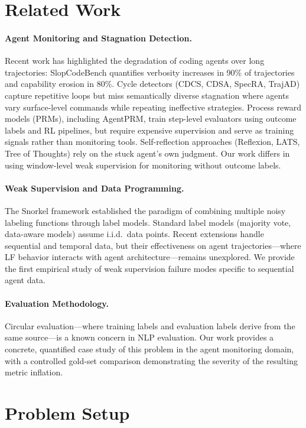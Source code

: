 \documentclass[11pt]{article}
\begin{document}
\section{Related Work}

\paragraph{Agent Monitoring and Stagnation Detection.}
Recent work has highlighted the degradation of coding agents over long trajectories: SlopCodeBench quantifies verbosity increases in 90\% of trajectories and capability erosion in 80\%. Cycle detectors (CDCS, CDSA, SpecRA, TrajAD) capture repetitive loops but miss semantically diverse stagnation where agents vary surface-level commands while repeating ineffective strategies. Process reward models (PRMs), including AgentPRM, train step-level evaluators using outcome labels and RL pipelines, but require expensive supervision and serve as training signals rather than monitoring tools. Self-reflection approaches (Reflexion, LATS, Tree of Thoughts) rely on the stuck agent's own judgment. Our work differs in using window-level weak supervision for monitoring without outcome labels.

\paragraph{Weak Supervision and Data Programming.}
The Snorkel framework established the paradigm of combining multiple noisy labeling functions through label models. Standard label models (majority vote, data-aware models) assume i.i.d.\ data points. Recent extensions handle sequential and temporal data, but their effectiveness on agent trajectories---where LF behavior interacts with agent architecture---remains unexplored. We provide the first empirical study of weak supervision failure modes specific to sequential agent data.

\paragraph{Evaluation Methodology.}
Circular evaluation---where training labels and evaluation labels derive from the same source---is a known concern in NLP evaluation. Our work provides a concrete, quantified case study of this problem in the agent monitoring domain, with a controlled gold-set comparison demonstrating the severity of the resulting metric inflation.

\section{Problem Setup}
\label{sec:setup}
\end{document}
